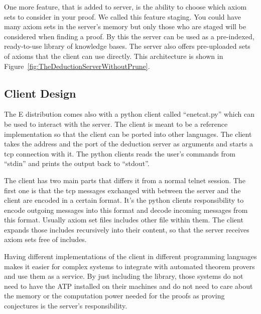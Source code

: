 
One more feature, that is added to server, is the ability to choose which axiom sets to consider in your proof. We called this feature staging. You could have many axiom sets in the server's memory but only those who are staged will be considered when finding a proof. By this the server can be used as a pre-indexed, ready-to-use library of knowledge bases. The server also offers pre-uploaded sets of axioms that the client can use directly. This architecture is shown in Figure~\ref{fig:TheDeductionServerWithoutPrune}.


\subsection{Client Design}
The E distribution comes also with a python client called ``enetcat.py'' which can be used to interact with the server. The client is meant to be a reference implementation so that the client can be ported into other languages. The client takes the address and the port of the deduction server as arguments and starts a \ac{tcp} connection with it. The python clients reads the user's commands from ``stdin'' and prints the output back to ``stdout''.

The client has two main parts that differs it from a normal telnet session. The first one is that the \ac{tcp} messages exchanged with between the server and the client are encoded in a certain format. It's the python clients responsibility to encode outgoing messages into this format and decode incoming messages from this format. Usually axiom set files includes other file within them. The client expands those includes recursively into their content, so that the server receives axiom sets free of includes.

Having different implementations of the client in different programming languages makes it easier for complex systems to integrate with automated theorem provers and use them as a service. By just including the library, those systems do not need to have the ATP installed on their machines and do not need to care about the memory or the computation power needed for the proofs as proving conjectures is the server's responsibility.

